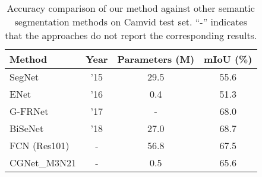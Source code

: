 \documentclass[10pt,twocolumn,letterpaper]{article}
\begin{document}
\begin{table}[t]
\begin{center}

\begin{tabular}{|lccc|}
\hline
Method           &Year  & Parameters (M)   & mIoU (\%)  \\
\hline\hline
SegNet \cite{badrinarayanan2017segnet}  &'15     & 29.5             & 55.6 \\
ENet \cite{paszke2016enet}              &'16     & 0.4              & 51.3 \\
G-FRNet \cite{amirul2017gated}          &'17     &-                 & 68.0\\
BiSeNet \cite{yu2018bisenet}            &'18     & 27.0             & 68.7 \\
\hline
FCN (Res101)                           & -       & 56.8             &  67.5   \\
CGNet\_M3N21                           & -       & 0.5              & 65.6\\
\hline
\end{tabular}
\end{center}
\caption{Accuracy comparison of our method against other semantic segmentation methods on Camvid test set.  ``-'' indicates that the approaches do not report the corresponding results.}
\label{table:tab11}
\vspace{-15pt}
\end{table}

\vspace{-10pt}
\end{document}
